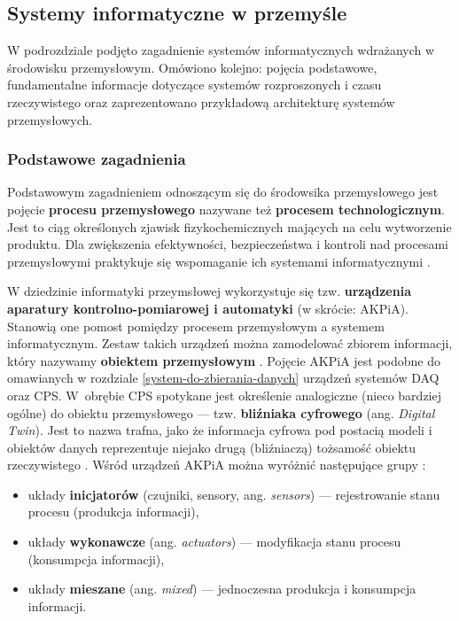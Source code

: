 \documentclass[a4paper, 12pt, twoside]{article}
\begin{document}
\subsection{Systemy informatyczne w przemyśle} \label{isp}

W podrozdziale podjęto zagadnienie systemów informatycznych wdrażanych w środowisku przemysłowym.
Omówiono kolejno: pojęcia podstawowe, fundamentalne informacje dotyczące systemów rozproszonych i czasu rzeczywistego
oraz zaprezentowano przykładową architekturę systemów przemysłowych.

\subsubsection{Podstawowe zagadnienia}

Podstawowym zagadnieniem odnoszącym się do środowsika przemysłowego jest pojęcie
\textbf{procesu przemysłowego} nazywane też \textbf{procesem technologicznym}.
Jest to ciąg określonych zjawisk fizykochemicznych mających na celu wytworzenie
produktu. Dla zwiększenia efektywności, bezpieczeństwa i kontroli nad procesami
przemysłowymi praktykuje się wspomaganie ich systemami informatycznymi \cite{isp}.

W dziedzinie informatyki przeymsłowej wykorzystuje się tzw.
\textbf{urządzenia aparatury kontrolno-pomiarowej i automatyki} (w skrócie: AKPiA).
Stanowią one pomost pomiędzy procesem przemysłowym a systemem informatycznym.
Zestaw takich urządzeń można zamodelować zbiorem informacji, który nazywamy
\textbf{obiektem przemysłowym} \cite{isp}. Pojęcie AKPiA jest podobne do omawianych
w rozdziale \ref{system-do-zbierania-danych} urządzeń systemów DAQ oraz CPS. W~obrębie
CPS spotykane jest określenie analogiczne (nieco bardziej ogólne) do obiektu przemysłowego ---
tzw. \textbf{bliźniaka cyfrowego} (ang. \emph{Digital Twin}).
Jest to nazwa trafna, jako że informacja cyfrowa pod postacią modeli i obiektów
danych reprezentuje niejako drugą (bliźniaczą) tożsamość obiektu rzeczywistego
\cite{iiot-challenges-opportunities-directions}.
Wśród urządzeń AKPiA można wyróżnić następujące grupy \cite{isp}:
\begin{itemize}
      \itemsep0em
      \item układy \textbf{inicjatorów} (czujniki, sensory, ang. \emph{sensors}) --- rejestrowanie stanu procesu (produkcja informacji),
      \item układy \textbf{wykonawcze} (ang. \emph{actuators}) --- modyfikacja stanu procesu (konsumpcja informacji),
      \item układy \textbf{mieszane} (ang. \emph{mixed}) --- jednoczesna produkcja i konsumpcja informacji.
\end{itemize}
\end{document}

